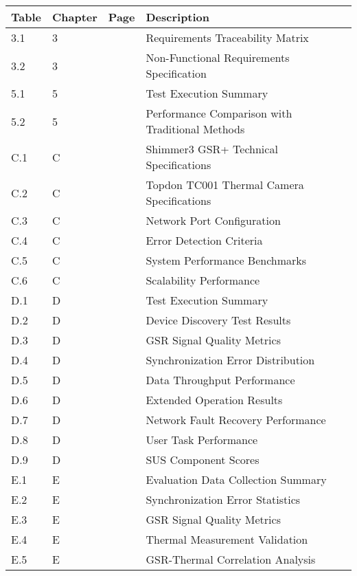 \begin{longtable}{|l|l|l|p{6cm}|}
\hline
\textbf{Table} & \textbf{Chapter} & \textbf{Page} & \textbf{Description} \\
\hline
\endhead
3.1 & 3 & \pageref{tab:req_trace} & Requirements Traceability Matrix \\
3.2 & 3 & \pageref{tab:nfr_specification} & Non-Functional Requirements Specification \\
5.1 & 5 & \pageref{tab:test_summary} & Test Execution Summary \\
5.2 & 5 & \pageref{tab:performance_comparison} & Performance Comparison with Traditional Methods \\
C.1 & C & \pageref{tab:shimmer_specs} & Shimmer3 GSR+ Technical Specifications \\
C.2 & C & \pageref{tab:topdon_specs} & Topdon TC001 Thermal Camera Specifications \\
C.3 & C & \pageref{tab:network_ports} & Network Port Configuration \\
C.4 & C & \pageref{tab:error_detection} & Error Detection Criteria \\
C.5 & C & \pageref{tab:performance_benchmarks} & System Performance Benchmarks \\
C.6 & C & \pageref{tab:scalability_performance} & Scalability Performance \\
D.1 & D & \pageref{tab:test_execution_summary} & Test Execution Summary \\
D.2 & D & \pageref{tab:device_discovery_results} & Device Discovery Test Results \\
D.3 & D & \pageref{tab:gsr_quality_metrics} & GSR Signal Quality Metrics \\
D.4 & D & \pageref{tab:sync_error_distribution} & Synchronization Error Distribution \\
D.5 & D & \pageref{tab:throughput_performance} & Data Throughput Performance \\
D.6 & D & \pageref{tab:extended_operation_results} & Extended Operation Results \\
D.7 & D & \pageref{tab:network_fault_recovery} & Network Fault Recovery Performance \\
D.8 & D & \pageref{tab:user_task_performance} & User Task Performance \\
D.9 & D & \pageref{tab:sus_component_scores} & SUS Component Scores \\
E.1 & E & \pageref{tab:data_collection_summary} & Evaluation Data Collection Summary \\
E.2 & E & \pageref{tab:sync_error_stats} & Synchronization Error Statistics \\
E.3 & E & \pageref{tab:gsr_signal_quality} & GSR Signal Quality Metrics \\
E.4 & E & \pageref{tab:thermal_validation} & Thermal Measurement Validation \\
E.5 & E & \pageref{tab:correlation_analysis} & GSR-Thermal Correlation Analysis \\
\hline
\end{longtable}

